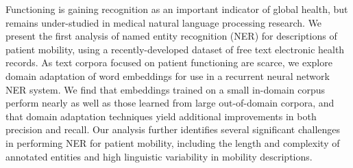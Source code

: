 Functioning is gaining recognition as an important indicator of global health, but remains under-studied in medical natural language processing research. We present the first analysis of named entity recognition (NER) for descriptions of patient mobility, using a recently-developed dataset of free text electronic health records. As text corpora focused on patient functioning are scarce, we explore domain adaptation of word embeddings for use in a recurrent neural network NER system. We find that embeddings trained on a small in-domain corpus perform nearly as well as those learned from large out-of-domain corpora, and that domain adaptation techniques yield additional improvements in both precision and recall. Our analysis further identifies several significant challenges in performing NER for patient mobility, including the length and complexity of annotated entities and high linguistic variability in mobility descriptions.
